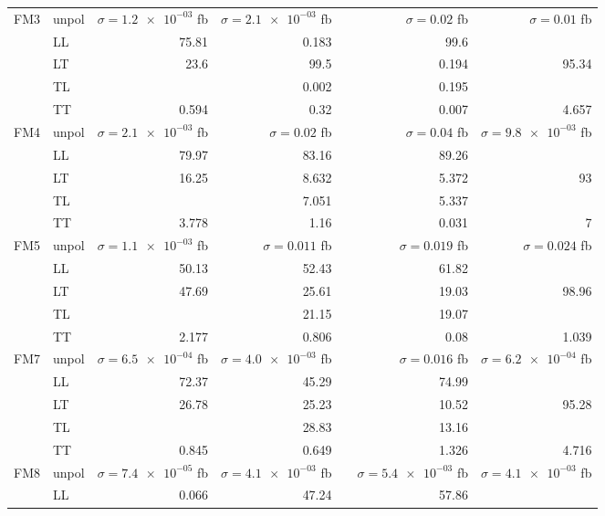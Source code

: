 \begin{table}[h]
{\begin{tabular}{llrrrrr}
\midrule
\multirow{5}{*}{FM3}
 & unpol & $\sigma = \num{1.2e-03}$ fb & $\sigma = \num{2.1e-03}$ fb &  & $\sigma = \num{0.02}$ fb & $\sigma = \num{0.01}$ fb \\
 & LL & \num{75.81} & \num{0.183} &  & \num{99.6} &  \\
 & LT & \num{23.6} & \num{99.5} &  & \num{0.194} & \num{95.34} \\
 & TL &  & \num{0.002} &  & \num{0.195} &  \\
 & TT & \num{0.594} & \num{0.32} &  & \num{0.007} & \num{4.657} \\
\midrule
\multirow{5}{*}{FM4}
 & unpol & $\sigma = \num{2.1e-03}$ fb & $\sigma = \num{0.02}$ fb &  & $\sigma = \num{0.04}$ fb & $\sigma = \num{9.8e-03}$ fb \\
 & LL & \num{79.97} & \num{83.16} &  & \num{89.26} &  \\
 & LT & \num{16.25} & \num{8.632} &  & \num{5.372} & \num{93} \\
 & TL &  & \num{7.051} &  & \num{5.337} &  \\
 & TT & \num{3.778} & \num{1.16} &  & \num{0.031} & \num{7} \\
\midrule
\multirow{5}{*}{FM5}
 & unpol & $\sigma = \num{1.1e-03}$ fb & $\sigma = \num{0.011}$ fb &  & $\sigma = \num{0.019}$ fb & $\sigma = \num{0.024}$ fb \\
 & LL & \num{50.13} & \num{52.43} &  & \num{61.82} &  \\
 & LT & \num{47.69} & \num{25.61} &  & \num{19.03} & \num{98.96} \\
 & TL &  & \num{21.15} &  & \num{19.07} &  \\
 & TT & \num{2.177} & \num{0.806} &  & \num{0.08} & \num{1.039} \\
\midrule
\multirow{5}{*}{FM7}
 & unpol & $\sigma = \num{6.5e-04}$ fb & $\sigma = \num{4.0e-03}$ fb &  & $\sigma = \num{0.016}$ fb & $\sigma = \num{6.2e-04}$ fb \\
 & LL & \num{72.37} & \num{45.29} &  & \num{74.99} &  \\
 & LT & \num{26.78} & \num{25.23} &  & \num{10.52} & \num{95.28} \\
 & TL &  & \num{28.83} &  & \num{13.16} &  \\
 & TT & \num{0.845} & \num{0.649} &  & \num{1.326} & \num{4.716} \\
\midrule
\multirow{5}{*}{FM8}
 & unpol & $\sigma = \num{7.4e-05}$ fb & $\sigma = \num{4.1e-03}$ fb &  & $\sigma = \num{5.4e-03}$ fb & $\sigma = \num{4.1e-03}$ fb \\
 & LL & \num{0.066} & \num{47.24} &  & \num{57.86} &  \\

\end{tabular}}
\end{table}
